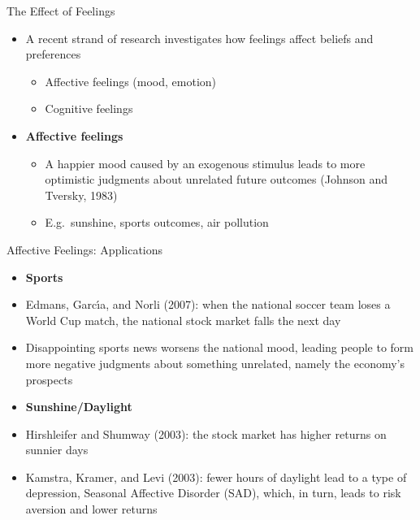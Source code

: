 \documentclass[aspectratio=169, 11pt]{beamer}
\begin{document}
\begin{frame}{The Effect of Feelings}
\begin{itemize}
\item A recent strand of research investigates how feelings affect beliefs and preferences
  \begin{itemize}
  \item Affective feelings (mood, emotion)
  \item Cognitive feelings
  \end{itemize}
\item \textbf{Affective feelings}
  \begin{itemize}
  \item A happier mood caused by an exogenous stimulus leads to more optimistic judgments about unrelated future outcomes (Johnson and Tversky, 1983) 
  \item E.g.\ sunshine, sports outcomes, air pollution
  \end{itemize}
\end{itemize}
\end{frame}

\begin{frame}{Affective Feelings: Applications}
\begin{itemize}
\item \textbf{Sports}
\item Edmans, Garc\'{\i}a, and Norli (2007): when the national soccer team loses a World Cup match, the national stock market falls the next day
\item Disappointing sports news worsens the national mood, leading people to form more negative judgments about something unrelated, namely the economy's prospects
\item \textbf{Sunshine/Daylight}
\item Hirshleifer and Shumway (2003): the stock market has higher returns on sunnier days
\item Kamstra, Kramer, and Levi (2003): fewer hours of daylight lead to a type of depression, Seasonal Affective Disorder (SAD), which, in turn, leads to risk aversion and lower returns
\end{itemize}
\end{frame}
\end{document}
